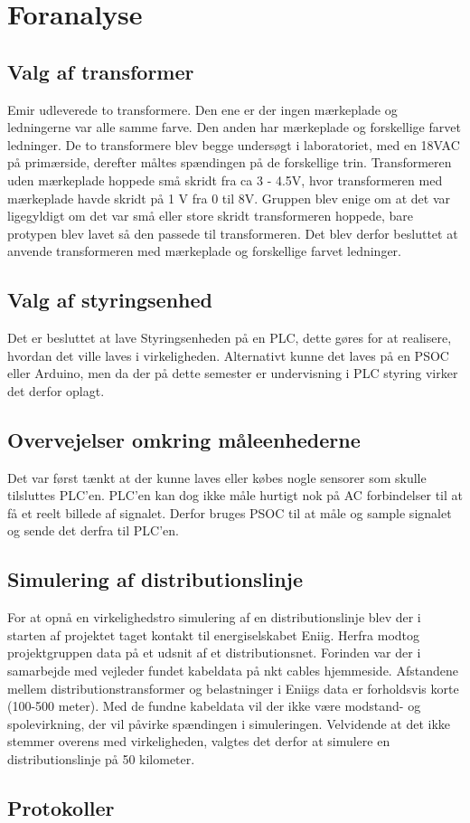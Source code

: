 
\chapter{Foranalyse}

\section{Valg af transformer}
Emir udleverede to transformere. Den ene er der ingen mærkeplade og ledningerne var alle samme farve. Den anden har mærkeplade og forskellige farvet ledninger. De to transformere blev begge undersøgt i laboratoriet, med en 18VAC på primærside, derefter måltes spændingen på de forskellige trin. Transformeren uden mærkeplade hoppede små skridt fra ca 3 - 4.5V, hvor transformeren med mærkeplade havde skridt på 1 V fra 0 til 8V. Gruppen blev enige om at det var ligegyldigt om det var små eller store skridt transformeren hoppede, bare protypen blev lavet så den passede til transformeren. Det blev derfor besluttet at anvende transformeren med mærkeplade og forskellige farvet ledninger. 

\section{Valg af styringsenhed}
Det er besluttet at lave Styringsenheden på en PLC, dette gøres for at realisere, hvordan det ville laves i virkeligheden. Alternativt kunne det laves på en PSOC eller Arduino, men da der på dette semester er undervisning i PLC styring virker det derfor oplagt.

\section{Overvejelser omkring måleenhederne}
Det var først tænkt at der kunne laves eller købes nogle sensorer som skulle tilsluttes PLC'en. PLC'en kan dog ikke måle hurtigt nok på AC forbindelser til at få et reelt billede af signalet. Derfor bruges PSOC til at måle og sample signalet og sende det derfra til PLC'en.

\section{Simulering af distributionslinje}
For at opnå en virkelighedstro simulering af en distributionslinje blev der i starten af projektet taget kontakt til energiselskabet Eniig. Herfra modtog projektgruppen data på et udsnit af et distributionsnet. Forinden var der i samarbejde med vejleder fundet kabeldata på nkt cables hjemmeside. Afstandene mellem distributionstransformer og belastninger i Eniigs data er forholdsvis korte (100-500 meter). Med de fundne kabeldata vil der ikke være modstand- og spolevirkning, der vil påvirke spændingen i simuleringen. Velvidende at det ikke stemmer overens med virkeligheden, valgtes det derfor at simulere en distributionslinje på 50 kilometer. 

\section{Protokoller}



